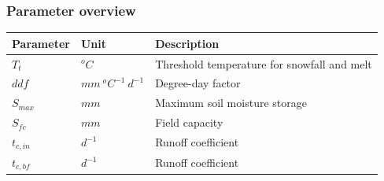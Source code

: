 \subsubsection{Parameter overview}
\begin{table}[htbp]
  \centering
    \begin{tabular}{lll}
    \midrule
    Parameter & Unit  & Description \\
    \midrule
    $T_t$ & $^oC$ & Threshold temperature for snowfall and melt \\
    $ddf$ & $mm~^oC^{-1}~d^{-1}$ & Degree-day factor \\
    $S_{max}$ & $mm$  & Maximum soil moisture storage \\
    $S_{fc}$ & $mm$  & Field capacity \\
    $t_{c,in}$ & $d^{-1}$ & Runoff coefficient \\
    $t_{c,bf}$ & $d^{-1}$ & Runoff coefficient \\
    \bottomrule
    \end{tabular}%
  \label{tab:addlabel}%
\end{table}%
